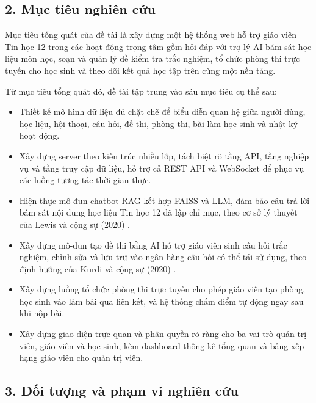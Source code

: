 \documentclass[12pt,a4paper]{article}
\begin{document}
	\subsection*{2. Mục tiêu nghiên cứu}
	
	Mục tiêu tổng quát của đề tài là xây dựng một hệ thống web hỗ trợ giáo viên Tin học 12 trong các hoạt động trọng tâm gồm hỏi đáp với trợ lý AI bám sát học liệu môn học, soạn và quản lý đề kiểm tra trắc nghiệm, tổ chức phòng thi trực tuyến cho học sinh và theo dõi kết quả học tập trên cùng một nền tảng.
	
	Từ mục tiêu tổng quát đó, đề tài tập trung vào sáu mục tiêu cụ thể sau:
	
	\begin{itemize}[leftmargin=1.5cm]
		\item Thiết kế mô hình dữ liệu đủ chặt chẽ để biểu diễn quan hệ giữa người dùng, học liệu, hội thoại, câu hỏi, đề thi, phòng thi, bài làm học sinh và nhật ký hoạt động.
		\item Xây dựng server theo kiến trúc nhiều lớp, tách biệt rõ tầng API, tầng nghiệp vụ và tầng truy cập dữ liệu, hỗ trợ cả REST API và WebSocket để phục vụ các luồng tương tác thời gian thực.
		\item Hiện thực mô-đun chatbot RAG kết hợp FAISS và LLM, đảm bảo câu trả lời bám sát nội dung học liệu Tin học 12 đã lập chỉ mục, theo cơ sở lý thuyết của Lewis và cộng sự (2020) \cite{lewis2020rag}.
		\item Xây dựng mô-đun tạo đề thi bằng AI hỗ trợ giáo viên sinh câu hỏi trắc nghiệm, chỉnh sửa và lưu trữ vào ngân hàng câu hỏi có thể tái sử dụng, theo định hướng của Kurdi và cộng sự (2020) \cite{kurdi2020qg}.
		\item Xây dựng luồng tổ chức phòng thi trực tuyến cho phép giáo viên tạo phòng, học sinh vào làm bài qua liên kết, và hệ thống chấm điểm tự động ngay sau khi nộp bài.
		\item Xây dựng giao diện trực quan và phân quyền rõ ràng cho ba vai trò quản trị viên, giáo viên và học sinh, kèm dashboard thống kê tổng quan và bảng xếp hạng giáo viên cho quản trị viên.
	\end{itemize}
	
	\subsection*{3. Đối tượng và phạm vi nghiên cứu}
	
\end{document}
